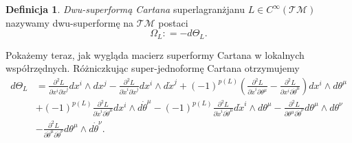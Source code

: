 \documentclass[11pt,a4paper]{report}
\theoremstyle{definition}
\newtheorem{definition}[theorem]{Definicja}
\begin{document}
\begin{definition}
 \textit{Dwu-superformą Cartana} superlagranżjanu $L\in C^\infty(\mathcal{TM} )$ nazywamy dwu-superformę na $\mathcal{TM}$ postaci
 \begin{equation}
  \Omega_L: = - d \Theta_L.
 \end{equation}
\end{definition}

Pokażemy teraz, jak wygląda macierz superformy Cartana w lokalnych współrzędnych. Różniczkując super-jednoformę Cartana otrzymujemy
\begin{equation*}
\begin{aligned}
 d\Theta_L &= 
 \frac{\partial^2 L}{\partial x^i \partial \dot x^j} dx^i \wedge dx^j
 - \frac{\partial^2 L}{\partial \dot x^i \partial \dot x^j} dx^i \wedge d\dot x^j
 + (-1)^{p(L)} \left( \frac{\partial^2 L}{\partial \dot x^i \partial \theta^\mu} - \frac{\partial^2 L}{\partial x^i \partial \dot \theta^\mu} \right) dx^i \wedge d\theta^\mu \\
 &+ (-1)^{p(L)} \frac{\partial^2 L}{\partial \dot x^i \partial \dot \theta^\mu} dx^i \wedge d\dot \theta^\mu 
 - (-1)^{p(L)} \frac{\partial^2 L}{\partial \dot x^i \partial \dot \theta^\mu} d\dot x^i \wedge d\theta^\mu 
 - \frac{\partial^2 L}{\partial \theta^\mu \partial \dot \theta^\nu} d\theta^\mu \wedge d\theta^\nu \\
 &- \frac{\partial^2 L}{\partial \dot \theta^\mu \partial \dot \theta^\nu} d\theta^\mu \wedge d \dot \theta^\nu.
\end{aligned}
\end{equation*}
\end{document}
